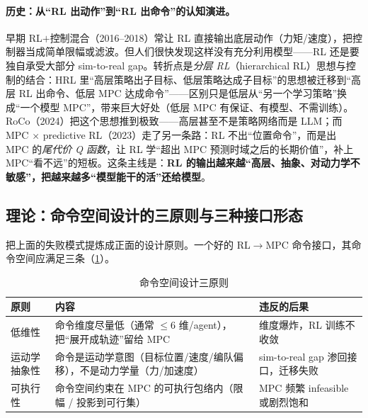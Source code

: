 \paragraph{历史：从“RL 出动作”到“RL 出命令”的认知演进。}
早期 RL$+$控制混合（2016--2018）常让 RL 直接输出底层动作（力矩/速度），把控制器当成简单限幅或滤波。但人们很快发现这样没有充分利用模型——RL 还是要独自承受大部分 sim-to-real gap。转折点是\emph{分层 RL}（hierarchical RL）思想与控制的结合：HRL 里“高层策略出子目标、低层策略达成子目标”的思想被迁移到“高层 RL 出命令、低层 MPC 达成命令”——区别只是低层从“另一个学习策略”换成“一个模型 MPC”，带来巨大好处（低层 MPC 有保证、有模型、不需训练）。RoCo\cite{mandi2024roco}（2024）把这个思想推到极致——高层甚至不是策略网络而是 LLM；而 MPC $\times$ predictive RL\cite{kovalev2023mpcrl}（2023）走了另一条路：RL 不出“位置命令”，而是出 MPC 的\emph{尾代价 Q 函数}，让 RL 学“超出 MPC 预测时域之后的长期价值”，补上 MPC“看不远”的短板。这条主线是：\textbf{RL 的输出越来越“高层、抽象、对动力学不敏感”，把越来越多“模型能干的活”还给模型}。

\subsection{理论：命令空间设计的三原则与三种接口形态}
\label{sec:mh-cmd-space}

把上面的失败模式提炼成正面的设计原则。一个好的 RL$\to$MPC 命令接口，其命令空间应满足三条（\cref{tab:mh-cmd-principle}）。

\begin{table}[H]\centering\small
\caption{命令空间设计三原则}
\label{tab:mh-cmd-principle}
\begin{tabular}{p{2.4cm}p{5.6cm}p{4.2cm}}
\toprule
原则 & 内容 & 违反的后果 \\
\midrule
低维性 & 命令维度尽量低（通常 $\le 6$ 维/agent），把“展开成轨迹”留给 MPC & 维度爆炸，RL 训练不收敛 \\
运动学抽象性 & 命令是运动学意图（目标位置/速度/编队偏移），不是动力学量（力/加速度） & sim-to-real gap 渗回接口，迁移失败 \\
可执行性 & 命令空间约束在 MPC 的可执行包络内（限幅 / 投影到可行集） & MPC 频繁 infeasible 或剧烈饱和 \\
\bottomrule
\end{tabular}
\end{table}

